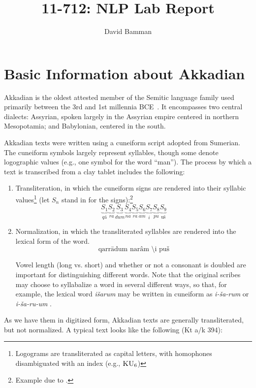 \documentclass[11pt,letterpaper]{article}
\title{11-712:  NLP Lab Report}
\author{David Bamman}
\begin{document}
\maketitle

\section{Basic Information about Akkadian}

Akkadian is the oldest attested member of the Semitic language family used primarily between the 3rd and 1st millennia BCE\ \cite[xxi]{huehnergard}.  It encompasses two central dialects: Assyrian, spoken largely in the Assyrian empire centered in northern Mesopotamia; and Babylonian, centered in the south.

Akkadian texts were written using a cuneiform script adopted from Sumerian.  The cuneiform symbols largely represent syllables, though some denote logographic values (e.g., one symbol for the word ``man''). 
The process by which a text is transcribed from a clay tablet includes the following:

\begin{enumerate}
\item Transliteration, in which the cuneiform signs are rendered into their syllabic values\footnote{Logograms are transliterated as capital letters, with homophones disambiguated with an index (e.g., $\textrm{\sc{KU}}_6$)}
(let $S_n$ stand in for the signs):\footnote{Example due to \cite[72]{huehnergard}.}
$$
\underbrace{S_1}_{q\textrm{\'a}} \underbrace{S_2}_{ra} \underbrace{S_3}_{dum} \underbrace{S_4}_{na} \underbrace{S_5}_{ra} \underbrace{S_6}_{am} \underbrace{S_7}_{i} \underbrace{S_8}_{pu} \underbrace{S_9}_{\textrm{u\v{s}}}
$$
\item Normalization, in which the transliterated syllables are rendered into the lexical form of the word.  $$
\textrm{qarr\=adum nar\^am \=\i pu\v{s}}
$$

Vowel length (long vs. short) and whether or not a consonant is doubled are important for distinguishing different words. Note that the original scribes may choose to syllabalize a word in several different ways, so that, for example, the lexical word \emph{i\v{s}arum} may be written in cuneiform as \emph{i-\v{s}a-rum} or \emph{i-\v{s}a-ru-um} \cite[71]{huehnergard}.
\end{enumerate}

As we have them in digitized form, Akkadian texts are generally transliterated, but not normalized.  A typical text looks like the following (Kt a/k 394):
\end{document}
